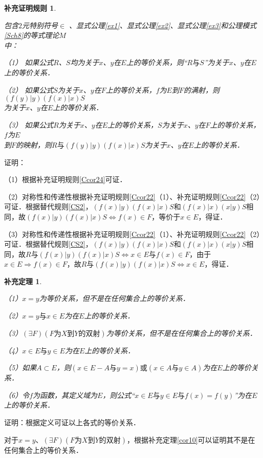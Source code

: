 \documentclass[12pt, a4paper, oneside]{book}
\newtheorem{Ccor}{补充证明规则}
\newtheorem{cor}{补充定理}
\begin{document}
			\begin{Ccor}\label{Ccor30}
				\hfill\par
				包含$2$元特别符号$\in$ 、显式公理\ref{ex1}、显式公理\ref{ex2}、显式公理\ref{ex3}和公理模式\ref{Sch8}的等式理论$M$\\中：
				\par
				（1）	如果公式$R$、$S$均为关于$x$、$y$在$E$上的等价关系，则“$R\text{与}S$”为关于$x$、$y$在$E$上的等价关系．
				\par
				（2）	如果公式$S$为关于$x$、$y$在$F$上的等价关系，$f$为$E$到$F$的满射，则$(f(y)|y)(f(x)|x)S$\\为关于$x$、$y$在$E$上的等价关系．
				\par
				（3）	如果公式$R$为关于$x$、$y$在$E$上的等价关系，$S$为关于$x$、$y$在$F$上的等价关系，$f$为$E$\\到$F$的映射，则$R\text{与}(f(y)|y)(f(x)|x)S$为关于$x$、$y$在$E$上的等价关系．
			\end{Ccor}				
			证明：
			\par
			（1）根据补充证明规则\ref{Ccor24}可证．
			\par
			（2）对称性和传递性根据补充证明规则\ref{Ccor22}（1）、补充证明规则\ref{Ccor22}（2）可证．根据替代规则\ref{CS2}，$(f(x)|y)(f(x)|x)S$和$(f(x)|x)(x|y)S$相同，故$(f(x)|y)(f(x)|x)S\Leftrightarrow f(x)\in F$，等价于$x\in E$，得证．
			\par
			（3）对称性和传递性根据补充证明规则\ref{Ccor22}（1）、补充证明规则\ref{Ccor22}（2）可证．根据替代规则\ref{CS2}，$(f(x)|y)(f(x)|x)S$和$(f(x)|x)(x|y)S$相同，故$R\text{与}(f(x)|y)(f(x)|x)S\Leftrightarrow x\in E\text{与}f(x)\in F$，由于$x\in E\Rightarrow f(x)\in F$，故$R\text{与}(f(x)|y)(f(x)|x)S\Leftrightarrow x\in E$，得证．
			
			\begin{cor}\label{cor146}
				\hfill\par
				（1）$x=y$为等价关系，但不是在任何集合上的等价关系．
				\par
				（2）$x=y\text{与}x\in E$为在$E$上的等价关系．
				\par
				（3）$(\exists F)(F\text{为}X\text{到}Y\text{的双射})$为等价关系，但不是在任何集合上的等价关系．
				\par
				（4）$x\in E\text{与}y\in E$为在$E$上的等价关系．
				\par
				（5）如果$A\subset E$，则$(x\in E-A\text{与}y=x)\text{或}(x\in A\text{与}y\in A)$为在$E$上的等价关系．
				\par
				（6）令$f$为函数，其定义域为$E$，则公式“$x\in E\text{与}y\in E\text{与}f(x)=f(y)$”为在$E$上的等价关系．
			\end{cor}
			证明：根据定义可证以上各式的等价关系．
			\par
			对于$x=y$、$(\exists F)(F\text{为}X\text{到}Y\text{的双射})$，根据补充定理\ref{cor10}可以证明其不是在任何集合上的等价关系．
			
\end{document}
